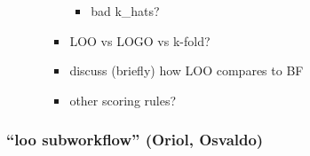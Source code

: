 \begin{itemize}
\begin{itemize}
\begin{itemize}
      \begin{itemize}
      \tightlist
      \item
        bad k\_hats?
      \end{itemize}
    \item
      LOO vs LOGO vs k-fold?
    \item
      discuss (briefly) how LOO compares to BF
    \item
      other scoring rules?
    \end{itemize}
  \end{itemize}
\end{itemize}

\hypertarget{loo-subworkflow-oriol-osvaldo}{%
\subsubsection{``loo subworkflow'' (Oriol,
Osvaldo)}\label{loo-subworkflow-oriol-osvaldo}}

